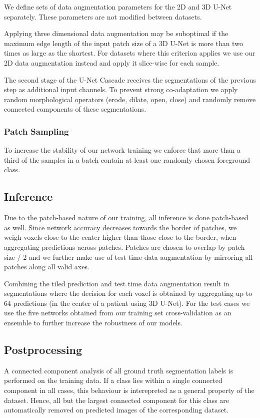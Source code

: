 \documentclass{templates/llncs} %
\begin{document}
    We define sets of data augmentation parameters for the 2D and 3D U-Net separately. These parameters are not modified between datasets.
    
    Applying three dimensional data augmentation may be suboptimal if the maximum edge length of the input patch size of a 3D U-Net is more than two times as large as the shortest. For datasets where this criterion applies we use our 2D data augmentation instead and apply it slice-wise for each sample.
    
    The second stage of the U-Net Cascade receives the segmentations of the previous step as additional input channels. To prevent strong co-adaptation we apply random morphological operators (erode, dilate, open, close) and randomly remove connected components of these segmentations.
    
    \subsubsection{Patch Sampling}
    To increase the stability of our network training we enforce that more than a third of the samples in a batch contain at least one randomly chosen foreground class.
    
    \subsection{Inference}
    Due to the patch-based nature of our training, all inference is done patch-based as well. Since network accuracy decreases towards the border of patches, we weigh voxels close to the center higher than those close to the border, when aggregating predictions across patches. Patches are chosen to overlap by patch size / 2 and we further make use of test time data augmentation by mirroring all patches along all valid axes.
    
    Combining the tiled prediction and test time data augmentation result in segmentations where the decision for each voxel is obtained by aggregating up to 64 predictions (in the center of a patient using 3D U-Net). For the test cases we use the five networks obtained from our training set cross-validation as an ensemble to further increase the robustness of our models.
    
    \subsection{Postprocessing}
    A connected component analysis of all ground truth segmentation labels is performed on the training data. If a class lies within a single connected component in all cases, this behaviour is interepreted as a general property of the dataset. Hence, all but the largest connected component for this class are automatically removed on predicted images of the corresponding dataset.
    
\end{document}

